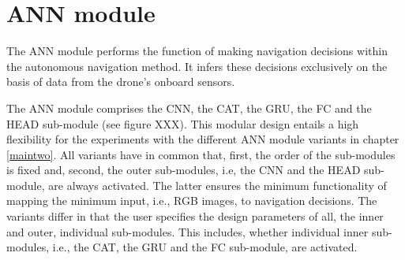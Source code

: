 \section{ANN module} \label{sec:ann_module}
The ANN module performs the function of making navigation decisions
within the autonomous navigation method.
It infers these decisions exclusively 
on the basis of data from the drone's onboard sensors.




The ANN module comprises
the CNN, the CAT, the GRU, the FC and the HEAD sub-module
(see figure XXX).
This modular design entails a high flexibility for the experiments
with the different ANN module variants in chapter \ref{maintwo}.
All variants have in common that,
first, the order of the sub-modules is fixed
and, second, the outer sub-modules, i.e, the CNN and the HEAD sub-module,
are always activated.
The latter ensures the minimum functionality of 
mapping the minimum input, i.e., RGB images,
to navigation decisions.
The variants differ in that
the user specifies the design parameters of 
all, the inner and outer, individual sub-modules.
This includes, whether individual inner sub-modules,
i.e., the CAT, the GRU and the FC sub-module,
are activated.


